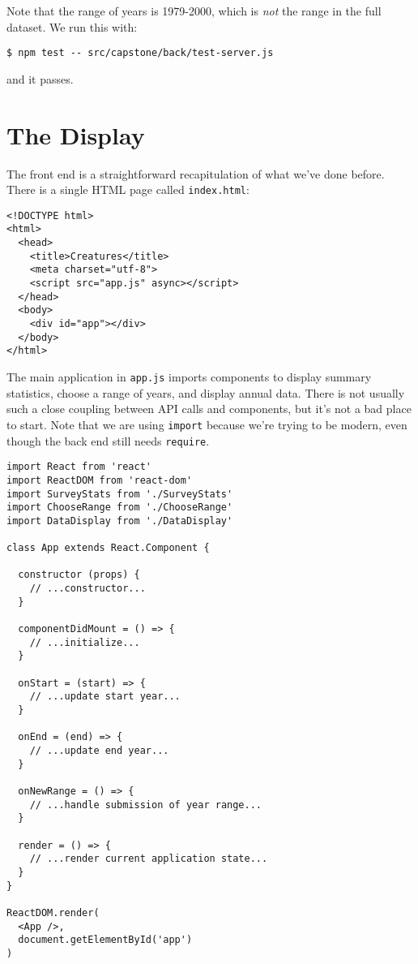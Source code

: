 Note that the range of years is 1979-2000,
which is \emph{not} the range in the full dataset.
We run this with:

\begin{verbatim}
$ npm test -- src/capstone/back/test-server.js
\end{verbatim}

\noindent
and it passes.

\section{The Display}\label{s:capstone-display}

The front end is a straightforward recapitulation of what we've done before.
There is a single HTML page called \texttt{index.html}:

\begin{verbatim}
<!DOCTYPE html>
<html>
  <head>
    <title>Creatures</title>
    <meta charset="utf-8">
    <script src="app.js" async></script>
  </head>
  <body>
    <div id="app"></div>
  </body>
</html>
\end{verbatim}

The main application in \texttt{app.js} imports components to display summary statistics,
choose a range of years,
and display annual data.
There is not usually such a close coupling between API calls and components,
but it's not a bad place to start.
Note that we are using \texttt{import} because we're trying to be modern,
even though the back end still needs \texttt{require}.

\begin{verbatim}
import React from 'react'
import ReactDOM from 'react-dom'
import SurveyStats from './SurveyStats'
import ChooseRange from './ChooseRange'
import DataDisplay from './DataDisplay'

class App extends React.Component {

  constructor (props) {
    // ...constructor...
  }

  componentDidMount = () => {
    // ...initialize...
  }

  onStart = (start) => {
    // ...update start year...
  }

  onEnd = (end) => {
    // ...update end year...
  }

  onNewRange = () => {
    // ...handle submission of year range...
  }

  render = () => {
    // ...render current application state...
  }
}

ReactDOM.render(
  <App />,
  document.getElementById('app')
)
\end{verbatim}

